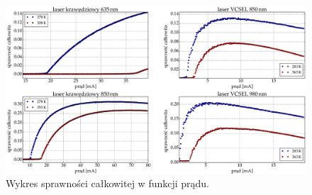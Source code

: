 \begin{figure}
\center
  \includegraphics[scale=0.30]{plot_common/plot_wall_eff.eps}
  \caption{Wykres sprawności całkowitej w funkcji prądu.}
  \label{fig:plot_wall_eff}
\end{figure}
\newpage
